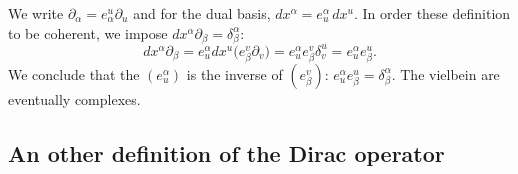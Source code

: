 We write $\partial_{\alpha}=e_{\alpha}^u\partial_u$ and for the dual basis, $dx^{\alpha}=e^{\alpha}_u\,dx^u$. In order these definition to be coherent, we impose $dx^{\alpha}\partial_{\beta}=\delta^{\alpha}_{\beta}$:
\begin{equation}
	dx^{\alpha}\partial_{\beta}=e_u^{\alpha}dx^u\big( e^v_{\beta}\partial_v \big)
	=e^{\alpha}_ue^v_{\beta}\delta^u_v
	=e^{\alpha}_ue^u_{\beta}.
\end{equation}
We conclude that the  $(e^{\alpha}_u)$ is the inverse of $(e^v_{\beta})$: $e^{\alpha}_ue^u_{\beta}=\delta^{\alpha}_{\beta}$. The vielbein are eventually complexes.



\subsection{An other definition of the Dirac operator}

